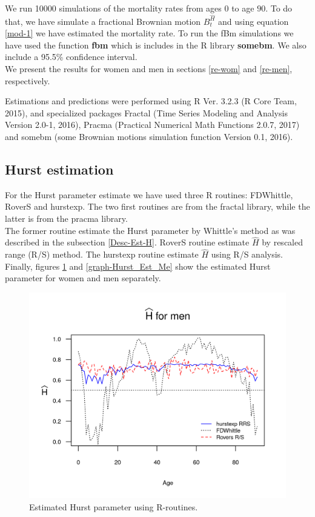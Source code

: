 \documentclass[smallextended]{svjour3}
\begin{document}
We run 10000 simulations of the mortality rates from ages $0$ to age $90$. To
do that, we have simulate a fractional Brownian motion $B_t^{\hat H}$ and using
equation \eqref{mod-1} we have estimated the mortality rate. To run the fBm
simulations we have used the function {\bf fbm} which is includes in the R
library {\bf somebm}.  We also include a  95.5\% confidence interval.\\


We present the results for women and men in sections \ref{re-wom} and
\ref{re-men}, respectively.

Estimations and predictions were performed using R Ver. 3.2.3 (R Core Team,
2015), and specialized packages
Fractal (Time Series Modeling and Analysis
Version 2.0-1, 2016), Pracma (Practical Numerical Math Functions 2.0.7, 2017)
and somebm (some Brownian motions simulation function Version 0.1, 2016).


\subsection{Hurst estimation}\label{hu-est}

For the Hurst parameter estimate we have used three R routines: FDWhittle,
RoverS and hurstexp.
The two first routines are from the fractal library, while the latter is from
the pracma library.\\

The former routine estimate the Hurst parameter by Whittle's method as was
described in the subsection \ref{Desc-Est-H}. RoverS routine
estimate $\hat H $ by rescaled range (R/S) method. The hurstexp routine
estimate $\hat H $  using
R/S analysis. \\

Finally, figures \ref{graph-Hurst_Est_Wo} and \ref{graph-Hurst_Est_Me} show
the estimated Hurst parameter for women and men separately.

\begin{figure}[H]
    \includegraphics{Hurst-Men.png}
    \caption{Estimated Hurst parameter using R-routines.}
    \label{graph-Hurst_Est_Wo}
\end{figure}
\end{document}
